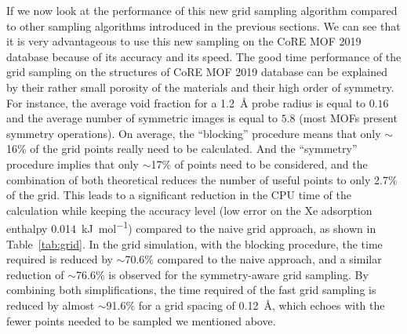 \documentclass[main]{subfiles}
\begin{document}
If we now look at the performance of this new grid sampling algorithm compared to other sampling algorithms introduced in the previous sections. We can see that it is very advantageous to use this new sampling on the CoRE MOF 2019 database because of its accuracy and its speed.
The good time performance of the grid sampling on the structures of CoRE MOF 2019 database can be explained by their rather small porosity of the materials and their high order of symmetry. For instance, the average void fraction for a \SI{1.2}{\angstrom} probe radius is equal to $0.16$ and the average number of symmetric images is equal to $5.8$ (most MOFs present symmetry operations). On average, the ``blocking'' procedure means that only {$\sim$16\%} of the grid points really need to be calculated. And the ``symmetry'' procedure implies that only {$\sim$17\%} of points need to be considered, and the combination of both theoretical reduces the number of useful points to only {2.7\%} of the grid. This leads to a significant reduction in the CPU time of the calculation while keeping the accuracy level (low error on the Xe adsorption enthalpy \SI{0.014}{\kilo\joule\per\mole}) compared to the naive grid approach, as shown in Table~\ref{tab:grid}. In the grid simulation, with the blocking procedure, the time required is reduced by {$\sim$70.6\%} compared to the naive approach, and a similar reduction of {$\sim$76.6\%} is observed for the symmetry-aware grid sampling. By combining both simplifications, the time required of the fast grid sampling is reduced by almost {$\sim$91.6\%} for a grid spacing of \SI{0.12}{\angstrom}, which echoes with the fewer points needed to be sampled we mentioned above.
\end{document}
